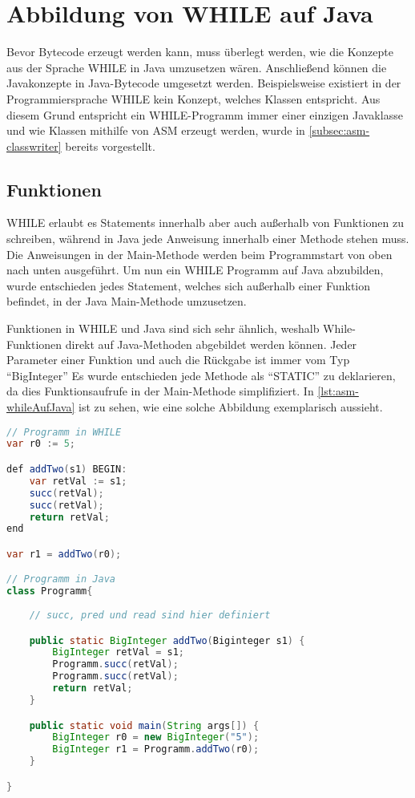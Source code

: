 \section{Abbildung von WHILE auf Java}
Bevor Bytecode erzeugt werden kann, muss überlegt werden, wie die Konzepte aus der Sprache WHILE in Java umzusetzen wären. Anschließend können die Javakonzepte in Java-Bytecode umgesetzt werden. Beispielsweise existiert in der Programmiersprache WHILE kein Konzept, welches Klassen entspricht. Aus diesem Grund entspricht ein WHILE-Programm immer einer einzigen Javaklasse und wie Klassen mithilfe von ASM erzeugt werden, wurde in \cref{subsec:asm-classwriter} bereits vorgestellt.

\subsection{Funktionen}
WHILE erlaubt es Statements innerhalb aber auch außerhalb von Funktionen zu schreiben, während in Java jede Anweisung innerhalb einer Methode stehen muss. Die Anweisungen in der Main-Methode werden beim Programmstart von oben nach unten ausgeführt. Um nun ein WHILE Programm auf Java abzubilden, wurde entschieden jedes Statement, welches sich außerhalb einer Funktion befindet, in der Java Main-Methode umzusetzen. 

Funktionen in WHILE und Java sind sich sehr ähnlich, weshalb While-Funktionen direkt auf Java-Methoden abgebildet werden können. Jeder Parameter einer Funktion und auch die Rückgabe ist immer vom Typ \enquote{BigInteger} Es wurde entschieden jede Methode als \enquote{STATIC} zu deklarieren, da dies Funktionsaufrufe in der Main-Methode simplifiziert. In \cref{lst:asm-whileAufJava} ist zu sehen, wie eine solche Abbildung exemplarisch aussieht.

\begin{lstlisting}[language=Java, caption=Abbildung von While Funktionen auf Java Funktionen, label={lst:asm-whileAufJava}]
// Programm in WHILE
var r0 := 5;

def addTwo(s1) BEGIN:
	var retVal := s1;
	succ(retVal);
	succ(retVal);
	return retVal;
end

var r1 = addTwo(r0);

// Programm in Java
class Programm{
	
	// succ, pred und read sind hier definiert

	public static BigInteger addTwo(Biginteger s1) {
		BigInteger retVal = s1;
		Programm.succ(retVal);
		Programm.succ(retVal);
		return retVal;
	}

	public static void main(String args[]) {
		BigInteger r0 = new BigInteger("5");
		BigInteger r1 = Programm.addTwo(r0);
	}

}

\end{lstlisting}

